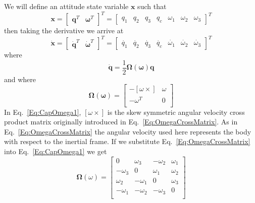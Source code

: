 We will define an attitude state variable $\mathbf{x}$ such that
%
\begin{equation}
	\mathbf{x} =
        \begin{bmatrix}
            \boldsymbol{q}^T & \boldsymbol\omega^T
        \end{bmatrix}^T
        =
        \begin{bmatrix}
            q_1 & q_2 & q_3 & q_c & \omega_1 & \omega_2 & \omega_3
        \end{bmatrix}^T
    \label{Eq:QuatStateVec}
\end{equation}
%
then taking the derivative we arrive at
%
\begin{equation}
	\mathbf{\dot{x}} =
        \begin{bmatrix}
            \boldsymbol{\dot{q}}^T & \boldsymbol{\dot{\omega}}^T
        \end{bmatrix}^T
        =
        \begin{bmatrix}
            \dot{q_1} & \dot{q_2} & \dot{q_3} & \dot{q_c} & \dot{\omega_1} & \dot{\omega_2} & \dot{\omega_3}
        \end{bmatrix}^T
    \label{Eq:QuatStateVecDot}
\end{equation}
%
where
%
\begin{equation}
	\boldsymbol{\dot{q}} =
        \frac{1}{2}\boldsymbol{\Omega(\omega)q}
    \label{Eq:QDot}
\end{equation}
%
and where
%
\begin{equation}
	\boldsymbol{\Omega(\omega)} =
        \begin{bmatrix}
        -[\omega\times] & \omega \\
         -\omega^T      &  0     \\
        \end{bmatrix}
    \label{Eq:CapOmega1}
\end{equation}
%
In Eq.~\ref{Eq:CapOmega1}, $[\omega\times]$ is the skew symmetric angular
velocity cross product matrix originally introduced in
Eq.~\ref{Eq:OmegaCrossMatrix}.  As in Eq.~\ref{Eq:OmegaCrossMatrix} the angular
velocity used here represents the body with respect to the inertial frame.  If
we substitute Eq.~\ref{Eq:OmegaCrossMatrix} into Eq.~\ref{Eq:CapOmega1} we get
%
\begin{equation}
    \boldsymbol{\Omega}(\omega) =
        \begin{bmatrix}
          0       &  \omega_3 & -\omega_2 &  \omega_1 \\
        -\omega_3 &   0       &  \omega_1 &  \omega_2 \\
         \omega_2 & -\omega_1 &   0       &  \omega_3 \\
        -\omega_1 & -\omega_2 & -\omega_3 &   0       \\
        \end{bmatrix}
    \label{Eq:CapOmega2}
\end{equation}
